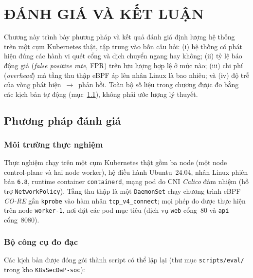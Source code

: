 
\chapter{ĐÁNH GIÁ VÀ KẾT LUẬN}
\label{ch:eval-bc2}
\label{ch:eval}

Chương này trình bày phương pháp và kết quả đánh giá định lượng hệ thống trên
một cụm Kubernetes thật, tập trung vào bốn câu hỏi: (i) hệ thống có phát hiện
đúng các hành vi quét cổng và dịch chuyển ngang hay không; (ii) tỷ lệ báo động
giả (\emph{false positive rate}, FPR) trên lưu lượng hợp lệ ở mức nào; (iii) chi
phí (\emph{overhead}) mà tầng thu thập eBPF áp lên nhân Linux là bao nhiêu; và
(iv) độ trễ của vòng phát hiện~$\rightarrow$~phản hồi. Toàn bộ số liệu trong
chương được đo bằng các kịch bản tự động (mục~\ref{sec:eval-method}), không phải
ước lượng lý thuyết.

\section{Phương pháp đánh giá}
\label{sec:eval-method}

\subsection{Môi trường thực nghiệm}

Thực nghiệm chạy trên một cụm Kubernetes thật gồm ba node (một node
control-plane và hai node worker), hệ điều hành Ubuntu~24.04, nhân Linux phiên
bản \texttt{6.8}, runtime container \texttt{containerd}, mạng pod do CNI
\emph{Calico} đảm nhiệm (hỗ trợ \texttt{NetworkPolicy}). Tầng thu thập là một
\texttt{DaemonSet} chạy chương trình eBPF \emph{CO-RE} gắn \texttt{kprobe} vào
hàm nhân \texttt{tcp\_v4\_connect}; mọi phép đo được thực hiện trên node
\texttt{worker-1}, nơi đặt các pod mục tiêu (dịch vụ \texttt{web} cổng~80 và
\texttt{api} cổng~8080).

\subsection{Bộ công cụ đo đạc}

Các kịch bản được đóng gói thành script có thể lặp lại
(thư mục \texttt{scripts/eval/} trong kho \texttt{K8sSecDaP-soc}):

